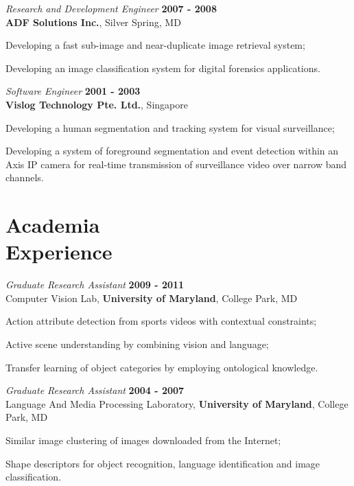 \documentclass[margin,line]{resume}
\begin{document}
\begin{resume}
         \textsl{Research and Development Engineer} \hfill \textbf{2007 - 2008}\\
         \textbf{ADF Solutions Inc.}, Silver Spring, MD
         \begin{list2}
             \item Developing a fast sub-image and near-duplicate image retrieval system;
             \item Developing an image classification system for digital forensics applications.
         \end{list2}
     
         \textsl{Software Engineer} \hfill \textbf{2001 - 2003}\\
         \textbf{Vislog Technology Pte. Ltd.}, Singapore
         \begin{list2}
             \item Developing a human segmentation and tracking system for visual surveillance;
             \item Developing a system of foreground segmentation and event detection within an Axis IP camera for real-time transmission of surveillance video over narrow band channels.
         \end{list2}
     
    \section{\mysidestyle Academia \\Experience}        
    \textsl{Graduate Research Assistant} \hfill \textbf{2009 - 2011}\\
    Computer Vision Lab, \textbf{University of Maryland}, College Park, MD
    \begin{list2}
    	\item Action attribute detection from sports videos with contextual constraints;
       \item Active scene understanding by combining vision and language;
       \item Transfer learning of object categories by employing ontological knowledge.
    \end{list2}

    \textsl{Graduate Research Assistant} \hfill \textbf{2004 - 2007}\\
    Language And Media Processing Laboratory, \textbf{University of Maryland}, College Park, MD
    \begin{list2}
        \item Similar image clustering of images downloaded from the Internet;
        \item Shape descriptors for object recognition, language identification and image classification.
    \end{list2}


\end{resume}
\end{document}
